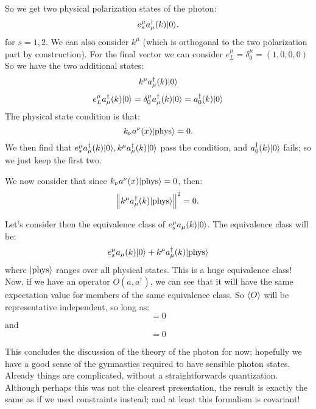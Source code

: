 So we get two physical polarization states of the photon:
\begin{equation}
    e^\mu_s a_\mu^\dagger(k)\lvert 0 \rangle.
\end{equation}
for $s = 1, 2$. We can also consider $k^\mu$ (which is orthogonal to the two polarization part by construction). For the final vector we can consider $e^\mu_L = \delta^{\mu}_0 = (1, 0, 0, 0)$ So we have the two additional states:
\begin{equation}
    k^\mu a_\mu^\dagger(k)\lvert 0 \rangle
\end{equation}
\begin{equation}
    e_L^\mu a_\mu^\dagger(k)\lvert 0 \rangle = \delta_0^\mu a_\mu^\dagger(k)\lvert 0 \rangle = a_0^\dagger(k)\lvert 0 \rangle
\end{equation}
The physical state condition is that:
\begin{equation}
    k_\nu a^\nu(x)\lvert \text{phys} \rangle = 0.
\end{equation}
We then find that $e^\mu_s a_\mu^\dagger(k)\lvert 0 \rangle, k^\mu a_\mu^\dagger(k)\lvert 0 \rangle$ pass the condition, and $a_0^\dagger(k)\lvert 0 \rangle$ fails; so we just keep the first two.

We now consider that since $ k_\nu a^\nu(x)\lvert \text{phys} \rangle = 0$, then:
\begin{equation}
    \norm{k^\mu a_\mu^\dagger(k)\lvert \text{phys} \rangle}^2 = 0.
\end{equation}

Let's consider then the equivalence class of $e^\mu_sa_\mu(k)\lvert 0 \rangle$. The equivalence class will be:
\begin{equation}
    e^\mu_s a_\mu(k)\lvert 0 \rangle + k^\mu a^\dagger_\mu(k)\lvert \text{phys} \rangle
\end{equation}
where $\lvert \text{phys} \rangle$ ranges over all physical states. This is a huge equivalence class! Now, if we have an operator $O(a, a^\dag)$, we can see that it will have the same expectation value for members of the same equivalence class. So $\left< O \right>$ will be representative independent, so long as:
\begin{equation}
    [O(a, a^\dag), k^\mu a_\mu^\dag(k)] = 0
\end{equation}
and
\begin{equation}
    [O(a, a^\dag), k^\mu a_\mu(k)] = 0
\end{equation}

This concludes the discussion of the theory of the photon for now; hopefully we have a good sense of the gymnastics required to have sensible photon states. Already things are complicated, without a straightforwards quantization. Although perhaps this was not the clearest presentation, the result is exactly the same as if we used constraints instead; and at least this formalism is covariant!

